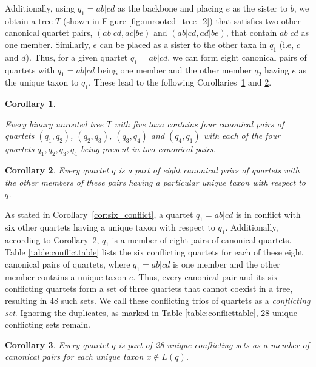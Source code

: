 \documentclass[10pt,a4paper]{article}
\newtheorem{corollary}{Corollary}[theorem]
\begin{document}
Additionally, using $q_1 =ab|cd$ as the backbone and placing $e$ as the sister to $b$, we obtain a tree $T$ (shown in Figure \ref{fig:unrooted_tree_2}) that satisfies two other canonical quartet pairs, $(ab|cd, ac|be)$ and $(ab|cd, ad|be)$, that contain $ab|cd$ as one member. Similarly, $e$ can be placed as a sister to the other taxa in $q_1$ (i.e, $c$ and $d$). Thus, for a given quartet $q_1 = ab|cd$, we can form eight canonical pairs of quartets with $q_1 = ab|cd$ being one member and the other member $q_2$ having $e$ as the unique taxon to $q_1$. These lead to the following Corollaries~\ref{cor:two-pair-quartets} and \ref{cor:eight-pairs}. %


\begin{corollary}
\label{cor:two-pair-quartets}
 
Every binary unrooted tree $T$ with five taxa contains four canonical pairs of quartets $(q_1,q_2)$, $(q_2,q_3)$, $(q_3,q_4)$ and $(q_4,q_1)$ with each of the four quartets $q_1, q_2, q_3, q_4$ being present in two canonical pairs. 
\end{corollary}

\begin{corollary}
\label{cor:eight-pairs}
Every quartet $q$ is a part of eight canonical pairs of quartets with the other members of these pairs having a particular unique taxon with respect to $q$. 
\end{corollary}


As stated in Corollary~\ref{cor:six_conflict}, a quartet $q_1 = ab|cd$ is in conflict with six other quartets having a unique taxon with respect to $q_1$. Additionally, according to Corollary~\ref{cor:eight-pairs}, $q_1$ is a member of eight pairs of canonical quartets. Table \ref{table:conflicttable} lists the six conflicting quartets for each of these eight canonical pairs of quartets, where $q_1=ab|cd$ is one member and the other member contains a unique taxon $e$. Thus, every canonical pair and its six conflicting quartets form a set of three quartets that cannot coexist in a tree, resulting in 48 such sets. We call these conflicting trios of quartets as a \textit{conflicting set}. Ignoring the duplicates, as marked in Table \ref{table:conflicttable}, 28 unique conflicting sets remain.



\begin{corollary}
\label{cor:unique-conflict}
Every quartet $q$ is part of 28 unique conflicting sets as a member of canonical pairs for each unique taxon $x \notin L(q) $.
\end{corollary}
\end{document}
